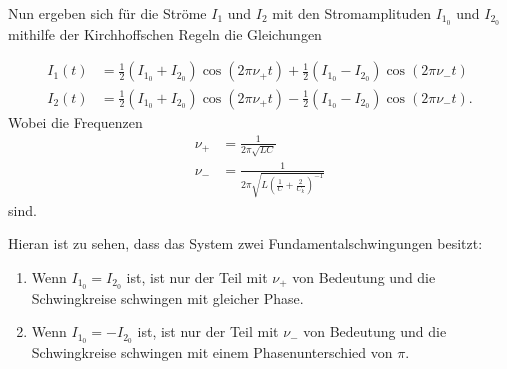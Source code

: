 Nun ergeben sich für die Ströme $I_1$ und $I_2$ mit den Stromamplituden $I_{1_0}$ und $I_{2_0}$ mithilfe der Kirchhoffschen Regeln die Gleichungen

\begin{align}
    \label{eq:strom}
    I_1(t) &= \frac{1}{2} (I_{1_0} + I_{2_0})\cos(2 \pi \nu _+ t) + \frac{1}{2} (I_{1_0} - I_{2_0})\cos(2 \pi \nu _- t) \\
    I_2(t) &= \frac{1}{2} (I_{1_0} + I_{2_0})\cos(2 \pi \nu _+ t) - \frac{1}{2} (I_{1_0} - I_{2_0})\cos(2 \pi \nu _- t).
\end{align}
Wobei die Frequenzen
\begin{align}
    \label{eq:frequenz+}
    \nu _+ &= \frac{1}{2 \pi \sqrt{L C}} \\
    \label{eq:frequenz-}
    \nu _- &= \frac{1}{2 \pi \sqrt{L \left( \frac{1}{C} + \frac{2}{C_k} \right)^{-1}}}
\end{align}
sind.\cite{V355}

Hieran ist zu sehen, dass das System zwei Fundamentalschwingungen besitzt:
\begin{enumerate}
\item Wenn $I_{1_0} = I_{2_0}$ ist, ist nur der Teil mit $\nu _+$ von Bedeutung und die Schwingkreise schwingen mit gleicher Phase.
\item Wenn $I_{1_0} = - I_{2_0}$ ist, ist nur der Teil mit $\nu _-$ von Bedeutung und die Schwingkreise schwingen mit einem Phasenunterschied von $\pi$.
\end{enumerate}

